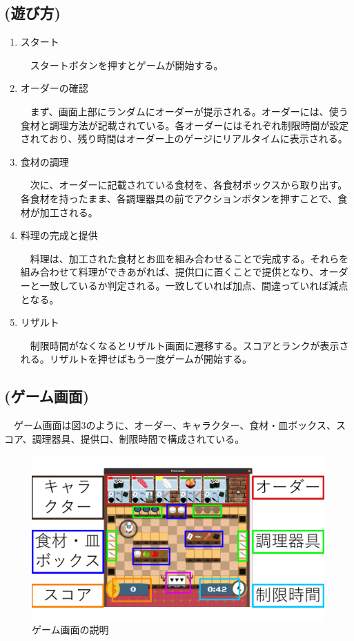 \documentclass[a4j]{jsarticle} %
\begin{document}
\subsection*{(遊び方)}
\begin{enumerate}
  \item スタート\par
  　スタートボタンを押すとゲームが開始する。 
  \item オーダーの確認\par
  　まず、画面上部にランダムにオーダーが提示される。オーダーには、使う食材と調理方法が記載されている。各オーダーにはそれぞれ制限時間が設定されており、残り時間はオーダー上のゲージにリアルタイムに表示される。
  \item 食材の調理\par
  　次に、オーダーに記載されている食材を、各食材ボックスから取り出す。各食材を持ったまま、各調理器具の前でアクションボタンを押すことで、食材が加工される。
  \item 料理の完成と提供\par
  　料理は、加工された食材とお皿を組み合わせることで完成する。それらを組み合わせて料理ができあがれば、提供口に置くことで提供となり、オーダーと一致しているか判定される。一致していれば加点、間違っていれば減点となる。   
  \item リザルト\par
  　制限時間がなくなるとリザルト画面に遷移する。スコアとランクが表示される。リザルトを押せばもう一度ゲームが開始する。
\end{enumerate}
\subsection*{(ゲーム画面)}
　ゲーム画面は図3のように、オーダー、キャラクター、食材・皿ボックス、スコア、調理器具、提供口、制限時間で構成されている。
\begin{figure}[H]
  \begin{center}
  \includegraphics[scale=0.3]{img/game.png}
  \caption{ゲーム画面の説明}
  \end{center}
\end{figure}
\end{document}
